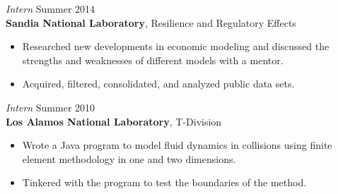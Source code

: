 \documentclass[margin, 10pt]{res} %
\begin{document}
\begin{resume}
{\sl Intern} \hfill Summer 2014 \\
\textbf{Sandia National Laboratory}, Resilience and Regulatory Effects
\begin{itemize} \itemsep -2pt
\item Researched new developments in economic modeling and discussed the strengths and weaknesses of different models with a mentor. 
\item Acquired, filtered, consolidated, and analyzed public data sets. 
\end{itemize}
 

{\sl Intern} \hfill Summer 2010 \\
\textbf{Los Alamos National Laboratory}, T-Division
\begin{itemize} \itemsep -2pt
\item Wrote a Java program to model fluid dynamics in collisions using finite element methodology in one and two dimensions. 
\item Tinkered with the program to test the boundaries of the method. 
\end{itemize} 

 

\end{resume}
\end{document}
